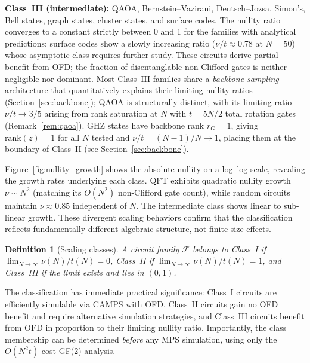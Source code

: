 \documentclass[a4paper,twocolumn,11pt]{quantumarticle}
\newtheorem{definition}[theorem]{Definition}
\begin{document}
\textbf{Class~III (intermediate):} QAOA, Bernstein--Vazirani, Deutsch--Jozsa, Simon's, Bell states, graph states, cluster states, and surface codes.
The nullity ratio converges to a constant strictly between 0 and 1 for the families with analytical predictions; surface codes show a slowly increasing ratio ($\nu/t \approx 0.78$ at $N = 50$) whose asymptotic class requires further study.
These circuits derive partial benefit from OFD; the fraction of disentanglable non-Clifford gates is neither negligible nor dominant.
Most Class~III families share a \emph{backbone sampling} architecture that quantitatively explains their limiting nullity ratios (Section~\ref{sec:backbone}); QAOA is structurally distinct, with its limiting ratio $\nu/t \to 3/5$ arising from rank saturation at $N$ with $t = 5N/2$ total rotation gates (Remark~\ref{rem:qaoa}).
GHZ states have backbone rank $r_G = 1$, giving $\mathrm{rank}(z) = 1$ for all $N$ tested and $\nu/t = (N-1)/N \to 1$, placing them at the boundary of Class~II (see Section~\ref{sec:backbone}).

Figure~\ref{fig:nullity_growth} shows the absolute nullity on a log--log scale, revealing the growth rates underlying each class.
QFT exhibits quadratic nullity growth $\nu \sim N^2$ (matching its $O(N^2)$ non-Clifford gate count), while random circuits maintain $\nu \approx 0.85$ independent of $N$.
The intermediate class shows linear to sub-linear growth.
These divergent scaling behaviors confirm that the classification reflects fundamentally different algebraic structure, not finite-size effects.

\begin{definition}[Scaling classes]
\label{def:classes}
A circuit family $\mathcal{F}$ belongs to Class~I if $\lim_{N\to\infty} \nu(N)/t(N) = 0$, Class~II if $\lim_{N\to\infty} \nu(N)/t(N) = 1$, and Class~III if the limit exists and lies in $(0,1)$.
\end{definition}

The classification has immediate practical significance: Class~I circuits are efficiently simulable via CAMPS with OFD, Class~II circuits gain no OFD benefit and require alternative simulation strategies, and Class~III circuits benefit from OFD in proportion to their limiting nullity ratio.
Importantly, the class membership can be determined \emph{before} any MPS simulation, using only the $O(N^2 t)$-cost GF(2) analysis.
\end{document}
